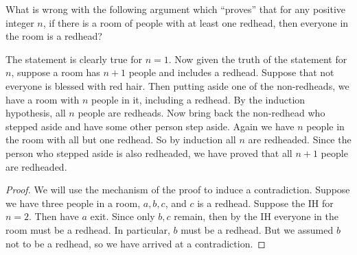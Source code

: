 \documentclass{assignment}
\begin{document}
\begin{question}[3]
  What is wrong with the following argument which ``proves'' that for any positive integer $n$, if
there is a room of people with at least one redhead, then everyone in the room is a redhead?
\begin{displayquote}
  The statement is clearly true for $n = 1$. Now given the truth of the statement for $n$, suppose a
room has $n + 1$ people and includes a redhead. Suppose that not everyone is blessed with red hair.
Then putting aside one of the non-redheads, we have a room with $n$ people in it, including a
redhead.  By the induction hypothesis, all $n$ people are redheads. Now bring back the non-redhead
who stepped aside and have some other person step aside. Again we have $n$ people in the room with
all but one redhead. So by induction all $n$ are redheaded. Since the person who stepped aside is
also redheaded, we have proved that all $n + 1$ people are redheaded. \\
\end{displayquote} 
\end{question}
\begin{proof}
  We will use the mechanism of the proof to induce a contradiction. Suppose we have three people in a
  room, $a,b,c$, and $c$ is a redhead. Suppose the IH for $n=2$. Then have $a$ exit. Since only $b,c$
  remain, then by the IH everyone in the room must be a redhead. In particular, $b$ must be a redhead.
  But we assumed $b$ not to be a redhead, so we have arrived at a contradiction.
\end{proof}
\end{document}
